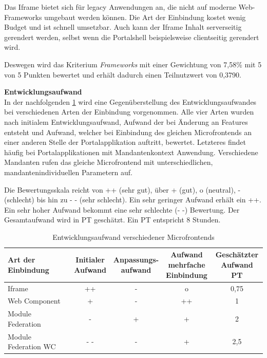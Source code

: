 Das Iframe bietet sich für legacy Anwendungen an, die nicht auf moderne Web-Frameworks umgebaut werden können. Die Art der Einbindung kostet wenig Budget und ist schnell umsetzbar. Auch kann der Iframe Inhalt serverseitig gerendert werden, selbst wenn die Portalshell beispielsweise clientseitig gerendert wird.

Deswegen wird das Kriterium \textit{Frameworks} mit einer Gewichtung von 7,58\% mit 5 von 5 Punkten bewertet und erhält dadurch einen Teilnutzwert von 0,3790.

\textbf{Entwicklungsaufwand}\\
In der nachfolgenden \cref{tab:GGAufwand} wird eine Gegenüberstellung des Entwicklungsaufwandes bei verschiedenen Arten der Einbindung vorgenommen. Alle vier Arten wurden nach initialem Entwicklungsaufwand, Aufwand der bei Änderung an Features entsteht und Aufwand, welcher bei Einbindung des gleichen Microfrontends an einer anderen Stelle der Portalapplikation auftritt, bewertet. Letzteres findet häufig bei Portalapplikationen mit Mandantenkontext Anwendung. Verschiedene Mandanten rufen das gleiche Microfrontend mit unterschiedlichen, mandantenindividuellen Parametern auf.

Die Bewertungsskala reicht von ++ (sehr gut), über + (gut), o (neutral), - (schlecht) bis hin zu - - (sehr schlecht). Ein sehr geringer Aufwand erhält ein ++. Ein sehr hoher Aufwand bekommt eine sehr schlechte (- -) Bewertung. Der Gesamtaufwand wird in \gls{PT} geschätzt. Ein \gls{PT} entspricht 8 Stunden.

\begin{table}[!hbt]
	\centering
	\begin{minipage}[t]{1\textwidth}	
		\caption{Entwicklungsaufwand verschiedener Microfrontends} %
		\begin{tabularx}{\columnwidth}{| X || c | c | c | c |}
			\toprule
			\thead{\textbf{Art der}\\ \textbf{Einbindung}} & \thead{\textbf{Initialer}\\ \textbf{Aufwand}} &
			\thead{\textbf{Anpassungs-} \\\textbf{aufwand}} & \thead{\textbf{Aufwand}\\ \textbf{mehrfache}\\ \textbf{Einbindung}} & \thead{\textbf{Geschätzter}\\ \textbf{Aufwand PT}}\\
			\midrule
			Iframe & ++ & - & o & 0,75\\
			Web Component & + & - & ++ & 1\\
			Module Federation & - & + & + & 2 \\
			Module Federation WC & - - & - & + & 2,5\\
			\bottomrule
		\end{tabularx}
		\label{tab:GGAufwand}
	\end{minipage}
\end{table}

